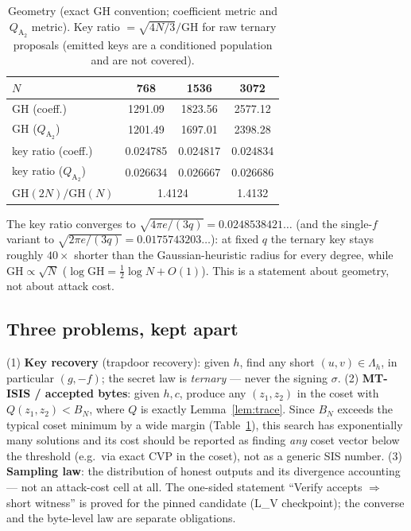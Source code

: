 \documentclass[11pt,a4paper]{article}
\theoremstyle{remark}
\newcommand{\Atwo}{Q_{\mathrm{A}_2}}
\newcommand{\Qform}{Q}
\begin{document}
\begin{table}[ht]\centering
\caption{Geometry (exact GH convention; coefficient metric and $\Atwo$
metric). Key ratio $=\sqrt{4N/3}/\mathrm{GH}$ for raw ternary proposals
(emitted keys are a conditioned population and are not covered).}
\label{tab:geo}
\begin{tabular}{lccc}
\toprule
$N$ & 768 & 1536 & 3072 \\
\midrule
$\mathrm{GH}$ (coeff.) & 1291.09 & 1823.56 & 2577.12 \\
$\mathrm{GH}$ ($\Atwo$) & 1201.49 & 1697.01 & 2398.28 \\
key ratio (coeff.) & 0.024785 & 0.024817 & 0.024834 \\
key ratio ($\Atwo$) & 0.026634 & 0.026667 & 0.026686 \\
$\mathrm{GH}(2N)/\mathrm{GH}(N)$ & \multicolumn{2}{c}{1.4124} & 1.4132 \\
\bottomrule
\end{tabular}
\end{table}

The key ratio converges to $\sqrt{4\pi e/(3q)}=0.0248538421\ldots$ (and the
single-$f$ variant to $\sqrt{2\pi e/(3q)}=0.0175743203\ldots$): at fixed
$q$ the ternary key stays roughly $40\times$ shorter than the
Gaussian-heuristic radius for every degree, while $\mathrm{GH}\propto\sqrt N$
($\log \mathrm{GH}=\tfrac12\log N+O(1)$). This is a statement about
geometry, not about attack cost.

\subsection{Three problems, kept apart}
\label{sec:problems}
(1) \textbf{Key recovery} (trapdoor recovery): given $h$, find any short
$(u,v)\in\Lambda_h$, in particular $(g,-f)$; the secret law is \emph{ternary}
--- never the signing $\sigma$. (2) \textbf{MT-ISIS / accepted bytes}: given
$h,c$, produce any $(z_1,z_2)$ in the coset with $\Qform(z_1,z_2)<B_N$, where
$\Qform$ is exactly Lemma~\ref{lem:trace}. Since $B_N$ exceeds the typical
coset minimum by a wide margin (Table~\ref{tab:geo}), this search has
exponentially many solutions and its cost should be reported as finding
\emph{any} coset vector below the threshold (e.g.\ via exact CVP in the
coset), not as a generic SIS number. (3) \textbf{Sampling law}: the
distribution of honest outputs and its divergence accounting --- not an
attack-cost cell at all. The one-sided statement ``Verify accepts
$\Rightarrow$ short witness'' is proved for the pinned candidate (L\_V
checkpoint); the converse and the byte-level law are separate obligations.
\end{document}
